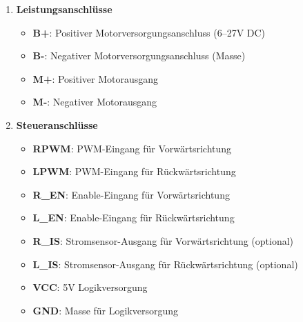 \begin{enumerate}
	\item \textbf{Leistungsanschlüsse}
	\begin{itemize}
		\item \textbf{B+}: Positiver Motorversorgungsanschluss (6--27V DC)
		\item \textbf{B-}: Negativer Motorversorgungsanschluss (Masse)
		\item \textbf{M+}: Positiver Motorausgang
		\item \textbf{M-}: Negativer Motorausgang
	\end{itemize}
	\item \textbf{Steueranschlüsse}
	\begin{itemize}
		\item \textbf{RPWM}: PWM-Eingang für Vorwärtsrichtung
		\item \textbf{LPWM}: PWM-Eingang für Rückwärtsrichtung
		\item \textbf{R\_EN}: Enable-Eingang für Vorwärtsrichtung
		\item \textbf{L\_EN}: Enable-Eingang für Rückwärtsrichtung
		\item \textbf{R\_IS}: Stromsensor-Ausgang für Vorwärtsrichtung (optional)
		\item \textbf{L\_IS}: Stromsensor-Ausgang für Rückwärtsrichtung (optional)
		\item \textbf{VCC}: 5V Logikversorgung
		\item \textbf{GND}: Masse für Logikversorgung
	\end{itemize} 
\end{enumerate}


%


